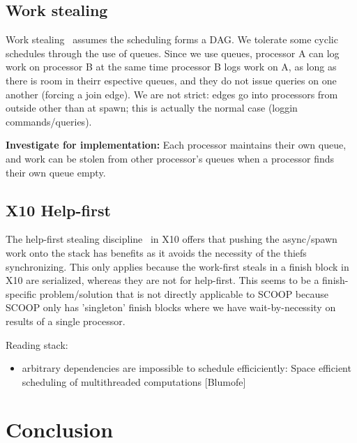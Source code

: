 \documentclass[a4]{article}
\begin{document}
\subsection{Work stealing}

Work stealing~\cite{blumofe:1994:scheduling} assumes the scheduling
forms a DAG. 
We tolerate some cyclic schedules through the use of queues.
Since we use queues, processor A can log work on processor B at the 
same time processor B logs work on A, as long as there is room in theirr
espective queues, and they do not issue queries on one another
(forcing a join edge).
We are not strict: edges go into processors from outside other than at spawn;
this is actually the normal case (loggin commands/queries).

\textbf{Investigate for implementation:}
Each processor maintains their own queue, and work can be stolen from
other processor's queues when a processor finds their own queue empty.

\subsection{X10 Help-first}
The help-first stealing discipline~\cite{guo:2009:work} in X10
offers that pushing the async/spawn work onto the stack has benefits
as it avoids the necessity of the thiefs synchronizing.
This only applies because the work-first steals 
in a finish block in X10 are serialized, 
whereas they are not for help-first.
This seems to be a finish-specific problem/solution
that is not directly applicable to SCOOP because
SCOOP only has 'singleton' finish blocks where we have wait-by-necessity
on results of a single  processor.

Reading stack:

\begin{itemize}
\item arbitrary dependencies are impossible to schedule efficiciently:
  Space efficient scheduling of multithreaded computations [Blumofe]
\end{itemize}


\section{Conclusion}

{}

\end{document}
